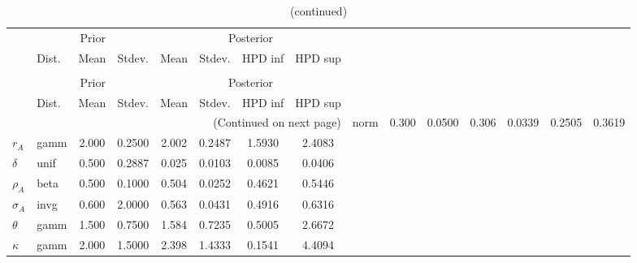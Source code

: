  
\begin{center}
\begin{longtable}{llcccccc} 
\caption{Results from Metropolis-Hastings (parameters)}
 \label{Table:MHPosterior:1}\\
\toprule 
  & \multicolumn{3}{c}{Prior}  &  \multicolumn{4}{c}{Posterior} \\
  \cmidrule(r{.75em}){2-4} \cmidrule(r{.75em}){5-8}
  & Dist. & Mean  & Stdev. & Mean & Stdev. & HPD inf & HPD sup\\
\midrule \endfirsthead 
\caption{(continued)}\\\toprule 
  & \multicolumn{3}{c}{Prior}  &  \multicolumn{4}{c}{Posterior} \\
  \cmidrule(r{.75em}){2-4} \cmidrule(r{.75em}){5-8}
  & Dist. & Mean  & Stdev. & Mean & Stdev. & HPD inf & HPD sup\\
\midrule \endhead 
\bottomrule \multicolumn{8}{r}{(Continued on next page)} \endfoot 
\bottomrule \endlastfoot 
${\alpha}$ & norm &   0.300 & 0.0500 &   0.306& 0.0339 &  0.2505 &  0.3619 \\ 
${r_{A}}$ & gamm &   2.000 & 0.2500 &   2.002& 0.2487 &  1.5930 &  2.4083 \\ 
${\delta}$ & unif &   0.500 & 0.2887 &   0.025& 0.0103 &  0.0085 &  0.0406 \\ 
${\rho_A}$ & beta &   0.500 & 0.1000 &   0.504& 0.0252 &  0.4621 &  0.5446 \\ 
${\sigma_A}$ & invg &   0.600 & 2.0000 &   0.563& 0.0431 &  0.4916 &  0.6316 \\ 
${\theta}$ & gamm &   1.500 & 0.7500 &   1.584& 0.7235 &  0.5005 &  2.6672 \\ 
${\kappa}$ & gamm &   2.000 & 1.5000 &   2.398& 1.4333 &  0.1541 &  4.4094 \\ 
\end{longtable}
 \end{center}
